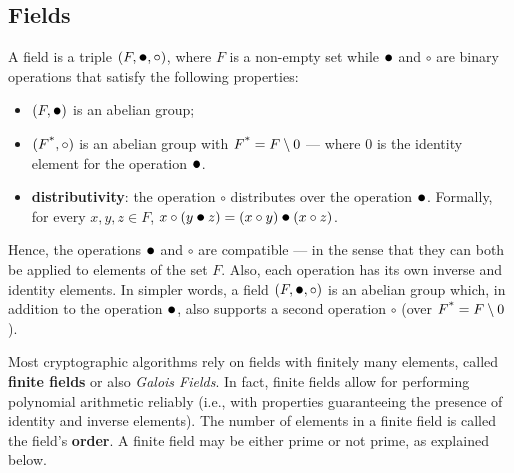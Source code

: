 \subsection{Fields}\label{sec:mathematical_underpinnings:fields}

A field is a triple $(F, \bigcdot, \bigemptydot)$, where $F$ is a non-empty set while $\bigcdot$ and $\circ$ are binary operations that satisfy the following properties:

\begin{itemize}
	\item $(F, \bigcdot)$ is an abelian group;
	\item $(F\textsuperscript{*}, \circ)$ is an abelian group with $F\textsuperscript{*} = F \setminus 0$ --- where $0$ is the identity element for the operation $\bigcdot$.
	\item \textbf{distributivity}: the operation $\circ$ distributes over the operation $\bigcdot$. Formally, for every $x, y, z \in F$, $x \circ (y \bigcdot z) = (x \circ y) \bigcdot (x \circ z)$.
\end{itemize}

Hence, the operations $\bigcdot$ and $\circ$ are compatible --- in the sense that they can both be applied to elements of the set $F$. Also, each operation has its own inverse and identity elements. In simpler words, a field $(F, \bigcdot, \circ)$ is an abelian group which, in addition to the operation $\bigcdot$, also supports a second operation $\circ$ (over $F\textsuperscript{*} = F \setminus 0$).


Most cryptographic algorithms rely on fields with finitely many elements, called \textbf{finite fields} or also \textit{Galois Fields}. In fact, finite fields allow for performing polynomial arithmetic reliably (i.e., with properties guaranteeing the presence of identity and inverse elements). The number of elements in a finite field is called the field's \textbf{order}. A finite field may be either prime or not prime, as explained below.


